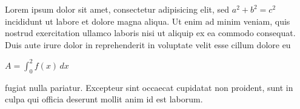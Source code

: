 \documentclass[12pt]{article}
\newcommand{\lowercaseheight}{1ex}
\newcommand{\uppercaseheight}{2ex}
\newcommand{\descenderdepth}{-0.5ex}
\newenvironment{drillsheet}{%
    \setlength\linenumbersep{0pt}%
    \renewcommand{\thelinenumber}{%
        \begin{tikzpicture}[overlay]
                \draw ((0,0) -- ++(\textwidth,0);
                \draw [ultra thin] ((0,\lowercaseheight) -- ++(\textwidth,0);
                \draw (0,\uppercaseheight) -- ++(\textwidth,0);
                \draw [ultra thin] (0,\descenderdepth) -- ++(\textwidth,0);
        \end{tikzpicture}%
    }%
    \renewcommand\linenumberfont{\normalfont\color{black}}
    \begin{linenumbers}%
        \color{black!25}%
}{
    \end{linenumbers}%
}
\newenvironment{fakedisplaymath}{%
   \begin{center}%
   $\displaystyle
}{%
   $%
   \end{center}%
}
\begin{document}
\Large
\begin{drillsheet}
    Lorem ipsum dolor sit amet, consectetur adipisicing elit, sed $a^2+b^2=c^2$
    incididunt ut labore et dolore magna aliqua. Ut enim ad minim veniam, quis
    nostrud exercitation ullamco laboris nisi ut aliquip ex ea commodo consequat.
    Duis aute irure dolor in reprehenderit in voluptate velit esse cillum dolore eu
    \begin{fakedisplaymath}
       A=\int_0^2f(x)\,dx
    \end{fakedisplaymath}
    fugiat nulla pariatur. Excepteur sint occaecat cupidatat non proident, sunt in
    culpa qui officia deserunt mollit anim id est laborum.
\end{drillsheet}
\end{document}
